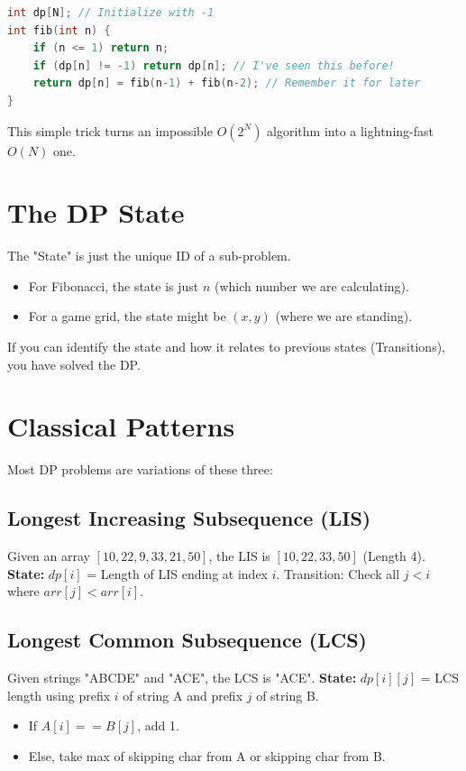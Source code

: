 \documentclass[12pt, a4paper]{report}
\begin{document}
\begin{lstlisting}[language=C++]
int dp[N]; // Initialize with -1
int fib(int n) {
    if (n <= 1) return n;
    if (dp[n] != -1) return dp[n]; // I've seen this before!
    return dp[n] = fib(n-1) + fib(n-2); // Remember it for later
}
\end{lstlisting}
This simple trick turns an impossible $O(2^N)$ algorithm into a lightning-fast $O(N)$ one.

\section{The DP State}
The "State" is just the unique ID of a sub-problem.
\begin{itemize}
    \item For Fibonacci, the state is just $n$ (which number we are calculating).
    \item For a game grid, the state might be $(x, y)$ (where we are standing).
\end{itemize}
If you can identify the state and how it relates to previous states (Transitions), you have solved the DP.

\section{Classical Patterns}
Most DP problems are variations of these three:

\subsection{Longest Increasing Subsequence (LIS)}
Given an array $[10, 22, 9, 33, 21, 50]$, the LIS is $[10, 22, 33, 50]$ (Length 4).
\textbf{State:} $dp[i]$ = Length of LIS ending at index $i$.
Transition: Check all $j < i$ where $arr[j] < arr[i]$.

\subsection{Longest Common Subsequence (LCS)}
Given strings "ABCDE" and "ACE", the LCS is "ACE".
\textbf{State:} $dp[i][j]$ = LCS length using prefix $i$ of string A and prefix $j$ of string B.
\begin{itemize}
    \item If $A[i] == B[j]$, add 1.
    \item Else, take max of skipping char from A or skipping char from B.
\end{itemize}
\end{document}
